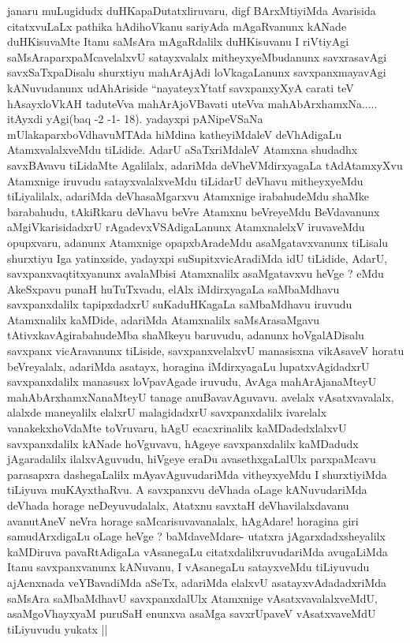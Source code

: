 \begin{artha}
janaru muLugidudx duHKapaDutatxliruvaru, digf BArxMtiyiMda Avarisida
citatxvuLaLx pathika hAdihoVkanu sariyAda mAgaRvanunx kANade
duHKisuvaMte Itanu saMsAra mAgaRdalilx duHKisuvanu I riVtiyAgi
saMsAraparxpaMcavelalxvU satayxvalalx mitheyxyeMbudanunx savxrasavAgi
savxSaTxpaDisalu shurxtiyu mahArAjAdi loVkagaLanunx savxpanxmayavAgi
kANuvudanunx udAhAriside ``nayateyxYtatf savxpanxyXyA carati teV
hAsayxloVkAH taduteVva mahArAjoVBavati uteVva
mahAbArxhamxNa..... itAyxdi yAgi(baq -2 -1- 18). yadayxpi pANipeVSaNa
mUlakaparxboVdhavuMTAda hiMdina katheyiMdaleV deVhAdigaLu
AtamxvalalxveMdu tiLidide. AdarU aSaTxriMdaleV Atamxna shudadhx
savxBAvavu tiLidaMte Agalilalx, adariMda deVheVMdirxyagaLa tAdAtamxyXvu
Atamxnige iruvudu satayxvalalxveMdu tiLidarU deVhavu mitheyxyeMdu
tiLiyalilalx, adariMda deVhasaMgarxvu Atamxnige irabahudeMdu shaMke
barabahudu, tAkiRkaru deVhavu beVre Atamxnu beVreyeMdu BeVdavanunx
aMgiVkarisidadxrU rAgadevxVSAdigaLanunx AtamxnalelxV iruvaveMdu
opupxvaru, adanunx Atamxnige opapxbAradeMdu asaMgatavxvanunx tiLisalu
shurxtiyu Iga yatinxside, yadayxpi suSupitxvicAradiMda idU tiLidide,
AdarU, savxpanxvaqtitxyanunx avalaMbisi Atamxnalilx asaMgatavxvu heVge
? eMdu AkeSxpavu punaH huTuTxvadu, elAlx iMdirxyagaLa saMbaMdhavu
savxpanxdalilx tapipxdadxrU suKaduHKagaLa saMbaMdhavu iruvudu
Atamxnalilx kaMDide, adariMda Atamxnalilx saMsArasaMgavu
tAtivxkavAgirabahudeMba shaMkeyu baruvudu, adanunx hoVgalADisalu
savxpanx vicAravanunx tiLiside, savxpanxvelalxvU manasisxna vikAsaveV
horatu beVreyalalx, adariMda asatayx, horagina iMdirxyagaLu
lupatxvAgidadxrU savxpanxdalilx manasusx loVpavAgade iruvudu, AvAga
mahArAjanaMteyU mahAbArxhamxNanaMteyU tanage anuBavavAguvavu. avelalx
vAsatxvavalalx, alalxde maneyalilx elalxrU malagidadxrU
savxpanxdalilx ivarelalx vanakekxhoVdaMte toVruvaru, hAgU
ecacxrinalilx kaMDadedxlalxvU savxpanxdalilx kANade hoVguvavu, hAgeye
savxpanxdalilx kaMDadudx jAgaradalilx ilalxvAguvudu, hiVgeye eraDu
avasethxgaLalUlx parxpaMcavu parasapxra dashegaLalilx
mAyavAguvudariMda vitheyxyeMdu I shurxtiyiMda tiLiyuva muKAyxthaRvu.
A savxpanxvu deVhada oLage kANuvudariMda deVhada horage
neDeyuvudalalx, Atatxnu savxtaH deVhavilalxdavanu avanutAneV neVra
horage saMcarisuvavanalalx, hAgAdare! horagina giri samudArxdigaLu
oLage heVge ? baMdaveMdare- utatxra jAgarxdadxsheyalilx kaMDiruva
pavaRtAdigaLa vAsanegaLu citatxdalilxruvudariMda avugaLiMda Itanu
savxpanxvanunx kANuvanu, I vAsanegaLu satayxveMdu tiLiyuvudu
ajAcnxnada veYBavadiMda aSeTx, adariMda elalxvU asatayxvAdadadxriMda
saMsAra saMbaMdhavU savxpanxdalUlx Atamxnige vAsatxvavalalxveMdU,
asaMgoVhayxyaM puruSaH enunxva asaMga savxrUpaveV vAsatxvaveMdU
tiLiyuvudu yukatx ||  
\end{artha}

